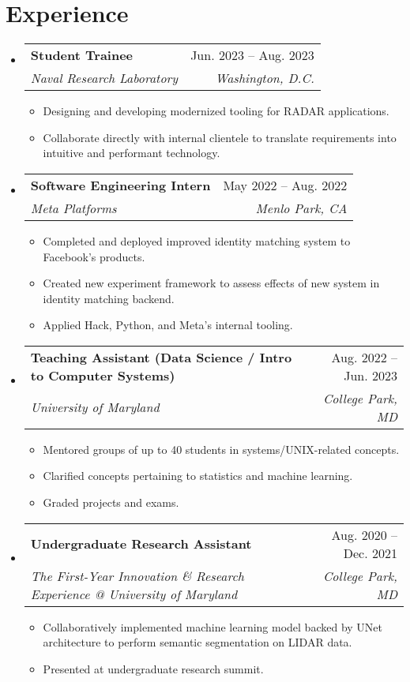 \documentclass[letterpaper,11pt]{article}
\makeatletter
\newcommand{\resumeItem}[1]{
  \item\small{
    {#1 \vspace{-2pt}}
  }
}
\newcommand{\resumeSubheading}[4]{
  \vspace{-2pt}\item
    \begin{tabular*}{0.97\textwidth}[t]{l@{\extracolsep{\fill}}r}
      \textbf{#1} & #2 \\
      \textit{\small#3} & \textit{\small #4} \\
    \end{tabular*}\vspace{-7pt}
}
\newcommand{\resumeSubSubheading}[2]{
    \item
    \begin{tabular*}{0.97\textwidth}{l@{\extracolsep{\fill}}r}
      \textit{\small#1} & \textit{\small #2} \\
    \end{tabular*}\vspace{-7pt}
}
\newcommand{\resumeSubHeadingListStart}{\begin{itemize}[leftmargin=0.15in, label={}]}
\newcommand{\resumeSubHeadingListEnd}{\end{itemize}}
\newcommand{\resumeItemListStart}{\begin{itemize}}
\newcommand{\resumeItemListEnd}{\end{itemize}\vspace{-5pt}}
\makeatother
\begin{document}
\section{Experience}
  \resumeSubHeadingListStart
    \resumeSubheading
    {Student Trainee}{Jun. 2023 -- Aug. 2023}
    {Naval Research Laboratory}{Washington, D.C.}
      \resumeItemListStart
        \resumeItem{Designing and developing modernized tooling for RADAR applications.}
        \resumeItem{Collaborate directly with internal clientele to translate requirements into intuitive and performant technology.}
      \resumeItemListEnd
    \resumeSubheading
      {Software Engineering Intern}{May 2022 -- Aug. 2022}
      {Meta Platforms}{Menlo Park, CA}
      \resumeItemListStart
        \resumeItem{Completed and deployed improved identity matching system to Facebook's products.}
        \resumeItem{Created new experiment framework to assess effects of new system in identity matching backend.}
        \resumeItem{Applied Hack, Python, and Meta's internal tooling.}
      \resumeItemListEnd

    \resumeSubheading
      {Teaching Assistant (Data Science / Intro to Computer Systems)}{Aug. 2022 -- Jun. 2023}
      {University of Maryland}{College Park, MD}
      \resumeItemListStart
        \resumeItem{Mentored groups of up to 40 students in systems/UNIX-related concepts.}
        \resumeItem{Clarified concepts pertaining to statistics and machine learning.}
        \resumeItem{Graded projects and exams.}
      \resumeItemListEnd

    \resumeSubheading
      {Undergraduate Research Assistant}{Aug. 2020 -- Dec. 2021}
      {The First-Year Innovation \& Research Experience @ University of Maryland}{College Park, MD}
      \resumeItemListStart
        \resumeItem{Collaboratively implemented machine learning model backed by UNet architecture to perform semantic segmentation on LIDAR data.}
        \resumeItem{Presented at undergraduate research summit.}
      \resumeItemListEnd

  \resumeSubHeadingListEnd


\end{document}
